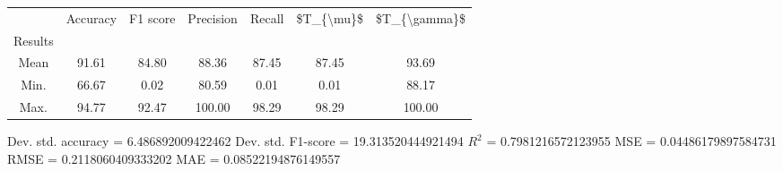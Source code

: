\begin{tabular}{|c|c|c|c|c|c|c|}
\toprule
{} &  Accuracy &  F1 score &  Precision &  Recall &  \$T\_\{\textbackslash mu\}\$ &  \$T\_\{\textbackslash gamma\}\$ \\
Results &           &           &            &         &            &               \\
\hline
Mean    &     91.61 &     84.80 &      88.36 &   87.45 &      87.45 &         93.69 \\
Min.    &     66.67 &      0.02 &      80.59 &    0.01 &       0.01 &         88.17 \\
Max.    &     94.77 &     92.47 &     100.00 &   98.29 &      98.29 &        100.00 \\
\bottomrule
\end{tabular}

 Dev. std. accuracy = 6.486892009422462
 Dev. std. F1-score = 19.313520444921494
 $R^2$ = 0.7981216572123955
 MSE = 0.04486179897584731
 RMSE = 0.2118060409333202
 MAE = 0.08522194876149557